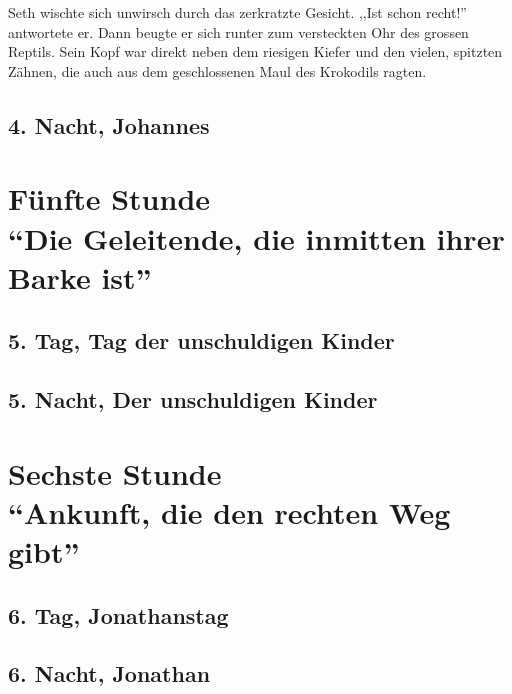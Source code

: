 \documentclass[11pt,titlepage,a5paper]{book}
\begin{document}
Seth wischte sich unwirsch durch das zerkratzte Gesicht. ,,Ist schon recht!'' antwortete er. Dann beugte er sich runter zum versteckten Ohr des grossen Reptils. Sein Kopf war direkt neben dem riesigen Kiefer und den vielen, spitzten Zähnen, die auch aus dem geschlossenen Maul des Krokodils ragten.





\chapter*{4. Nacht, Johannes}


\part*{Fünfte Stunde\\"`Die Geleitende, die inmitten ihrer Barke ist"'}

\chapter*{5. Tag, Tag der unschuldigen Kinder}

\chapter*{5. Nacht, Der unschuldigen Kinder}


\part*{Sechste Stunde\\"`Ankunft, die den rechten Weg gibt"'}

\chapter*{6. Tag, Jonathanstag}

\chapter*{6. Nacht, Jonathan}
\end{document}
